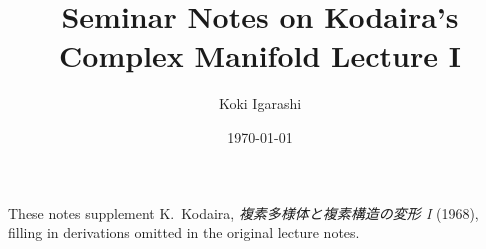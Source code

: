 \documentclass[11pt,oneside]{book}
\title{Seminar Notes on Kodaira's Complex Manifold Lecture I}
\author{Koki Igarashi}
\date{\today}
\begin{document}
\frontmatter
\maketitle

\begin{center}\small
These notes supplement K.~Kodaira, \emph{複素多様体と複素構造の変形 I} (1968),
filling in derivations omitted in the original lecture notes.
\end{center}

\tableofcontents

\mainmatter
\end{document}
